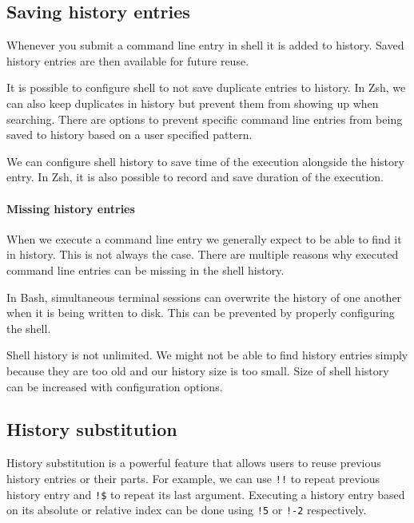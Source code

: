 \subsection{Saving history entries}

Whenever you submit a command line entry in shell it is added to history. Saved history entries are then available for future reuse. %

It is possible to configure shell to not save duplicate entries to history.  
In Zsh, we can also keep duplicates in history but prevent them from showing up when searching.  
There are options to prevent specific command line entries from being saved to history based on a user specified pattern. %

We can configure shell history to save time of the execution alongside the history entry. In Zsh, it is also possible to record and save duration of the execution.

\paragraph{Missing history entries}

When we execute a command line entry we generally expect to be able to find it in history. This is not always the case. There are multiple reasons why executed command line entries can be missing in the shell history.

In Bash, simultaneous terminal sessions can overwrite the history of one another when it is being written to disk.\cite{bashman}\cite{bash-session-issues-1} This can be prevented by properly configuring the shell.

Shell history is not unlimited. We might not be able to find history entries simply because they are too old and our history size is too small. Size of shell history can be increased with configuration options. %

\subsection{History substitution}

History substitution is a powerful feature that allows users to reuse previous history entries or their parts. 
For example, we can use \verb|!!| to repeat previous history entry and \verb|!$| to repeat its last argument. Executing a history entry based on its absolute or relative index can be done using \verb|!5| or \verb|!-2| respectively.

